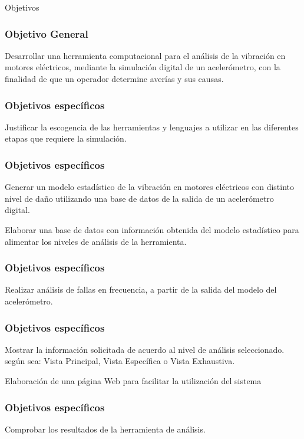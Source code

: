 \documentclass{beamer}
\begin{document}
\begin{frame}
   \huge
   Objetivos
\end{frame}

\begin{frame}
    \frametitle{Objetivo General}
    \large
	Desarrollar una herramienta computacional para el análisis de la vibración en
    motores eléctricos, mediante la simulación digital de un acelerómetro, con la
    finalidad de que un operador determine averías y sus causas.
\end{frame}

\begin{frame}
    \frametitle{Objetivos específicos}
    \large
    Justificar la escogencia de las herramientas y lenguajes a utilizar en las diferentes
etapas que requiere la simulación.
\end{frame}

\begin{frame}
    \frametitle{Objetivos específicos}

    \large
    Generar un modelo estadístico de la vibración en motores eléctricos con distinto
nivel de daño utilizando una base de datos de la salida de un acelerómetro
digital.\break \vfill
\pause

    Elaborar una base de datos con información obtenida del modelo estadístico
para alimentar los niveles de análisis de la herramienta.\break
\end{frame}

\begin{frame}
    \frametitle{Objetivos específicos}

    \large
    Realizar análisis de fallas en frecuencia, a partir de la salida del modelo del
acelerómetro.
\end{frame}

\begin{frame}
    \frametitle{Objetivos específicos}

    \large
    Mostrar la información solicitada de acuerdo al nivel de análisis seleccionado.
según sea: Vista Principal, Vista Específica o Vista Exhaustiva.\break\vfill
\pause

    Elaboración de una página Web para facilitar la utilización del sistema\break
\end{frame}

\begin{frame}
    \frametitle{Objetivos específicos}
    \large
    Comprobar los resultados de la herramienta de análisis.\break
\end{frame}
\end{document}
